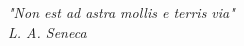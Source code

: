 \thispagestyle{empty}
\noindent
\thispagestyle{empty} 
\noindent  
\null{}
\begin{flushright} 
 \textit{"Non est ad astra mollis e terris via" \\ L. A. Seneca} 
\end{flushright}
\null 